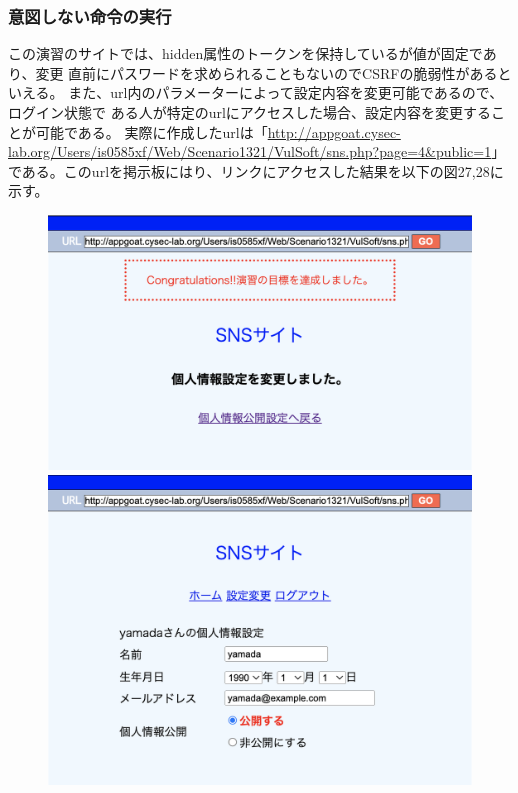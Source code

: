 \documentclass[dvipdfmx,autodetect-engine,titlepage]{jsarticle}
\begin{document}
\subsubsection*{意図しない命令の実行}
この演習のサイトでは、hidden属性のトークンを保持しているが値が固定であり、変更
直前にパスワードを求められることもないのでCSRFの脆弱性があるといえる。
また、url内のパラメーターによって設定内容を変更可能であるので、ログイン状態で
ある人が特定のurlにアクセスした場合、設定内容を変更することが可能である。
実際に作成したurlは「\url{http://appgoat.cysec-lab.org/Users/is0585xf/Web/Scenario1321/VulSoft/sns.php?page=4&public=1}」
である。このurlを掲示板にはり、リンクにアクセスした結果を以下の図27,28に示す。

\begin{figure}[h]
  \centering
  \begin{minipage}[b]{0.45\linewidth}
  \begin{center}
    \includegraphics[keepaspectratio,scale=0.35]{pic26.png}
    \end{center}
    \caption{}
  \end{minipage}
  \begin{minipage}[b]{0.45\linewidth}
  \begin{center}
    \includegraphics[keepaspectratio,scale=0.35]{pic27.png}
    \end{center}
    \caption{}
  \end{minipage}
\end{figure}
\end{document}
